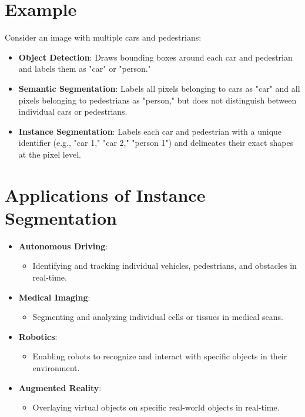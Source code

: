 \begin{notechapter}
\section{Example}
Consider an image with multiple cars and pedestrians:
\begin{itemize}
  \item \textbf{Object Detection}: Draws bounding boxes around each 
    car and pedestrian and labels them as "car" or "person."
  \item \textbf{Semantic Segmentation}: Labels all pixels belonging to 
    cars as "car" and all pixels belonging to pedestrians as "person," 
    but does not distinguish between individual cars or pedestrians.
  \item \textbf{Instance Segmentation}: Labels each car and pedestrian 
    with a unique identifier (e.g., "car 1," "car 2," "person 1") and 
    delineates their exact shapes at the pixel level.
\end{itemize}

\section{Applications of Instance Segmentation}
\begin{itemize}
  \item \textbf{Autonomous Driving}:
    \begin{itemize}
      \item Identifying and tracking individual vehicles, pedestrians, 
        and obstacles in real-time.
    \end{itemize}
  \item \textbf{Medical Imaging}:
    \begin{itemize}
      \item Segmenting and analyzing individual cells or tissues in 
        medical scans.
    \end{itemize}
  \item \textbf{Robotics}:
    \begin{itemize}
      \item Enabling robots to recognize and interact with specific 
        objects in their environment.
    \end{itemize}
  \item \textbf{Augmented Reality}:
    \begin{itemize}
      \item Overlaying virtual objects on specific real-world objects 
        in real-time.
    \end{itemize}
\end{itemize}


\end{notechapter}
